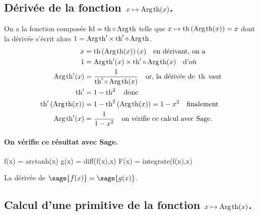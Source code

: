 \documentclass[a4paper,landscape,17pt]{extreport} %
\def\Id{\ensuremath{\mathrm{Id}}}
\renewcommand{\tanh}{\mathop{\mathrm{th}}}
\renewcommand{\arg}{\mathop{\mathrm{Arg}}}
\begin{document}
\subsection{Dérivée de la fonction $x \mapsto \arg\mspace{-1mu}\tanh(x)$.}
On a la fonction composée $\Id = \tanh \circ \arg\mspace{-1mu}\tanh$ telle que $x\mapsto\tanh\left(\arg\mspace{-1mu}\tanh(x)\right)=x$ dont la dérivée s'écrit alors $1= \arg\mspace{-1mu}\tanh\nolimits' \times \tanh\nolimits'\circ\arg\mspace{-1mu}\tanh$.
\begin{align*}
x & =\tanh\left(\arg\mspace{-1mu}\tanh(x)\right)(x) \quad \textrm{en dérivant, on a}\\
1 & = \arg\mspace{-1mu}\tanh\nolimits'(x) \times \tanh\nolimits'\circ\arg\mspace{-1mu}\tanh(x) \quad \textrm{d'où}\\
\arg\mspace{-1mu}\tanh\nolimits'(x) & =\frac{1}{ \tanh\nolimits'\circ\arg\mspace{-1mu}\tanh(x)}\quad \textrm{or, la dérivée de } \tanh \; \textrm{vaut}\\
\tanh\nolimits' & = 1-\tanh\nolimits^2 \quad \textrm{donc} \\
\tanh\nolimits'\left(\arg\mspace{-1mu}\tanh(x)\right) & = 1 - \tanh\nolimits^2 \left(\arg\mspace{-1mu}\tanh(x)\right) = 1 - x^2 \quad \textrm{finalement}\\
\arg\mspace{-1mu}\tanh\nolimits'(x) & = \frac{1}{ 1- x^2} \quad \textrm{on vérifie ce calcul avec Sage.}
\end{align*}


\paragraph{On vérifie ce résultat avec Sage.}



\begin{sageblock}
    f(x) = arctanh(x)
    g(x) = diff(f(x),x)
    F(x) = integrate(f(x),x)
\end{sageblock}

La dérivée de $\sage{f(x)} = \sage{g(x)} $.


\subsection{Calcul d'une primitive de la fonction  $x \mapsto \arg\mspace{-1mu}\tanh(x)$.}
\end{document}
